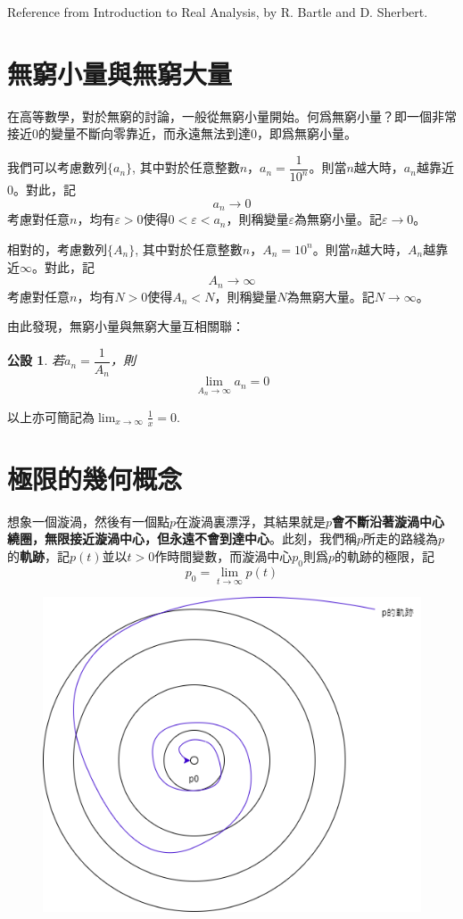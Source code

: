 \documentclass[12pt]{article}
\newtheorem*{axiom}{公設}
\begin{document}
    Reference from Introduction to Real Analysis, by R. Bartle and D. Sherbert.
    \section*{無窮小量與無窮大量}
    
    在高等數學，對於無窮的討論，一般從無窮小量開始。何爲無窮小量？即一個非常接近0的變量不斷向零靠近，而永遠無法到達0，即爲無窮小量。

    我們可以考慮數列$\{a_n\}$, 其中對於任意整數$n$，$a_n=\dfrac{1}{10^n}$。則當$n$越大時，$a_n$越靠近0。對此，記$$a_n\to 0$$考慮對任意$n$，均有$\varepsilon>0$使得$0<\varepsilon<a_n$，則稱變量$\varepsilon$為無窮小量。記$\varepsilon\to 0$。

    相對的，考慮數列$\{A_n\}$, 其中對於任意整數$n$，$A_n=10^n$。則當$n$越大時，$A_n$越靠近$\infty$。對此，記$$A_n\to \infty$$考慮對任意$n$，均有$N>0$使得$A_n<N$，則稱變量$N$為無窮大量。記$N\to \infty$。

    由此發現，無窮小量與無窮大量互相關聯：

    \begin{axiom}
        若$a_n=\dfrac{1}{A_n}$，則$$\lim_{A_n\to \infty}a_n=0$$ 
    \end{axiom}

    以上亦可簡記為$\displaystyle\lim_{x\to\infty}\frac{1}{x}=0$.

    \section*{極限的幾何概念}

    想象一個漩渦，然後有一個點$p$在漩渦裏漂浮，其結果就是\textbf{$p$會不斷沿著漩渦中心繞圈，無限接近漩渦中心，但永遠不會到達中心}。此刻，我們稱$p$所走的路綫為$p$的\textbf{軌跡}，記$p(t)$並以$t>0$作時間變數，而漩渦中心$p_0$則爲$p$的軌跡的極限，記$$p_0=\lim_{t\to\infty}p(t)$$

    \begin{figure}[H]
        \centering
        \includegraphics[scale=0.4]{limit1.png}
    \end{figure}    
\end{document}
